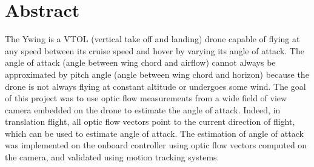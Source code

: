 \section*{Abstract}
The Ywing is a VTOL (vertical take off and landing) drone capable of flying at any speed between its cruise speed and hover by varying its angle of attack. The angle of attack (angle between wing chord and airflow) cannot always be approximated by pitch angle (angle between wing chord and horizon) because the drone is not always flying at constant altitude or undergoes some wind. The goal of this project was to use optic flow measurements from a wide field of view camera embedded on the drone to estimate the angle of attack. Indeed, in translation flight, all optic flow vectors point to the current direction of flight, which can be used to estimate angle of attack. The estimation of angle of attack was implemented on the onboard controller using optic flow vectors computed on the camera, and validated using motion tracking systems.